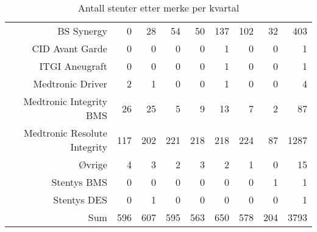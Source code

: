 \documentclass[presentation,xcolor=pdftex,dvipsnames,table]{beamer}
\begin{document}
\begin{frame}
\begin{tiny}
\begin{table}[ht]
\begin{tabular}{rrrrrrrrr}
  BS Synergy & 0 & 28 & 54 & 50 & 137 & 102 & 32 & 403 \\ 
  CID Avant Garde & 0 & 0 & 0 & 0 & 1 & 0 & 0 & 1 \\ 
  ITGI Aneugraft & 0 & 0 & 0 & 0 & 1 & 0 & 0 & 1 \\ 
  Medtronic Driver & 2 & 1 & 0 & 0 & 1 & 0 & 0 & 4 \\ 
  Medtronic Integrity BMS & 26 & 25 & 5 & 9 & 13 & 7 & 2 & 87 \\ 
  Medtronic Resolute Integrity & 117 & 202 & 221 & 218 & 218 & 224 & 87 & 1287 \\ 
  Øvrige & 4 & 3 & 2 & 3 & 2 & 1 & 0 & 15 \\ 
  Stentys BMS & 0 & 0 & 0 & 0 & 0 & 0 & 1 & 1 \\ 
  Stentys DES & 0 & 1 & 0 & 0 & 0 & 0 & 0 & 1 \\ 
  Sum & 596 & 607 & 595 & 563 & 650 & 578 & 204 & 3793 \\ 
   \bottomrule
\end{tabular}
\caption{Antall stenter etter merke per kvartal} 
\end{table}\end{tiny}
\end{frame}
\end{document}

